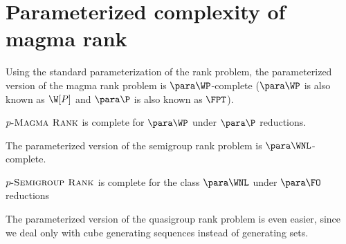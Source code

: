 \newcommand{\dash}{\textnormal{-}}
\section{Parameterized complexity of magma rank}\label{sec:parameterized}


%
%
%

Using the standard parameterization of the rank problem, the parameterized version of the magma rank problem is $\para \WP$-complete ($\para \WP$ is also known as $\W[P]$ and $\para \P$ is also known as $\FPT$).

\begin{theorem}[{\autocite[Theorem~3.19]{fg06}}]
  $p \dash \textsc{Magma Rank}$ is complete for $\para \WP$ under $\para \P$ reductions.
\end{theorem}

The parameterized version of the semigroup rank problem is $\para \WNL$-complete.
  
\begin{theorem}
  $p \dash \textsc{Semigroup Rank}$ is complete for the class $\para \WNL$ under $\para \FO$ reductions 
\end{theorem}

The parameterized version of the quasigroup rank problem is even easier, since we deal only with cube generating sequences instead of generating sets.

